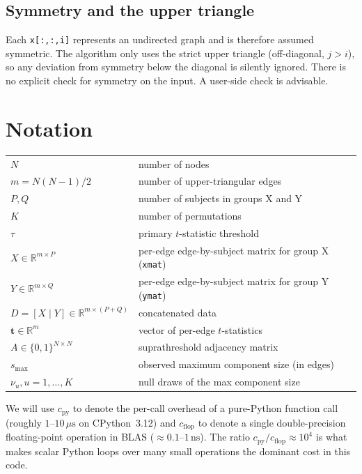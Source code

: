 \documentclass[11pt]{article}
\begin{document}
\subsection{Symmetry and the upper triangle}

Each \texttt{x[:,:,i]} represents an undirected graph and is therefore assumed symmetric. The algorithm only uses the strict upper triangle (off-diagonal, $j > i$), so any deviation from symmetry below the diagonal is silently ignored. There is no explicit check for symmetry on the input. A user-side check is advisable.

\section{Notation}

\begin{tabular}{ll}
$N$ & number of nodes \\
$m = N(N-1)/2$ & number of upper-triangular edges \\
$P, Q$ & number of subjects in groups X and Y \\
$K$ & number of permutations \\
$\tau$ & primary $t$-statistic threshold \\
$X \in \mathbb{R}^{m\times P}$ & per-edge edge-by-subject matrix for group X (\texttt{xmat}) \\
$Y \in \mathbb{R}^{m\times Q}$ & per-edge edge-by-subject matrix for group Y (\texttt{ymat}) \\
$D = [X \mid Y] \in \mathbb{R}^{m\times (P+Q)}$ & concatenated data \\
$\mathbf{t} \in \mathbb{R}^m$ & vector of per-edge $t$-statistics \\
$A \in \{0,1\}^{N\times N}$ & suprathreshold adjacency matrix \\
$s_{\max}$ & observed maximum component size (in edges) \\
$\nu_u, u=1{,}\ldots{,}K$ & null draws of the max component size
\end{tabular}

\bigskip
We will use $c_{\textrm{py}}$ to denote the per-call overhead of a pure-Python function call (roughly $1$--$10\,\mu\mathrm{s}$ on CPython~3.12) and $c_{\textrm{flop}}$ to denote a single double-precision floating-point operation in BLAS ($\approx 0.1$--$1\,\mathrm{ns}$). The ratio $c_{\textrm{py}} / c_{\textrm{flop}} \approx 10^4$ is what makes scalar Python loops over many small operations the dominant cost in this code.
\end{document}
